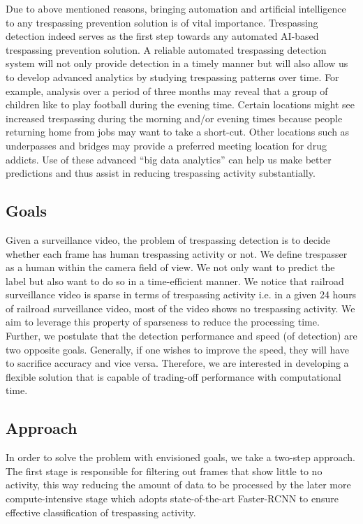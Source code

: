 Due to above mentioned reasons, bringing automation and artificial intelligence to any trespassing prevention solution is of vital importance. Trespassing detection indeed serves as the first step towards any automated AI-based trespassing prevention solution. A reliable automated trespassing detection system will not only provide detection in a timely manner but will also allow us to develop advanced analytics by studying trespassing patterns over time. For example, analysis over a period of three months may reveal that a group of children like to play football during the evening time. Certain locations might see increased trespassing during the morning and/or evening times because people returning home from jobs may want to take a short-cut. Other locations such as underpasses and bridges may provide a preferred meeting location for drug addicts. Use of these advanced ``big data analytics'' can help us make better predictions and thus assist in  reducing trespassing activity substantially.
\subsection{Goals}
\label{sec:goal}
Given a surveillance video, the problem of trespassing detection is to decide whether each frame has human trespassing activity or not. We define trespasser as a human within the camera field of view. We not only want to predict the label but also want to do so in a time-efficient manner. We notice that railroad surveillance video is sparse in terms of trespassing activity i.e. in a given 24 hours of railroad surveillance video, most of the video shows no trespassing activity. We aim to leverage this property of sparseness to reduce the processing time. 
Further, we postulate that the detection performance and speed (of detection) are two opposite goals. Generally, if one wishes to improve the speed, they will have to sacrifice accuracy and vice versa. Therefore, we are interested in developing a  flexible solution that is capable of trading-off performance with computational time.
\subsection{Approach}
In order to solve the problem with envisioned goals, we take a two-step approach. The first stage is responsible for filtering out frames that show little to no activity, this way reducing the amount of data to be processed by the later more compute-intensive stage which adopts state-of-the-art Faster-RCNN to ensure effective classification of trespassing activity.
